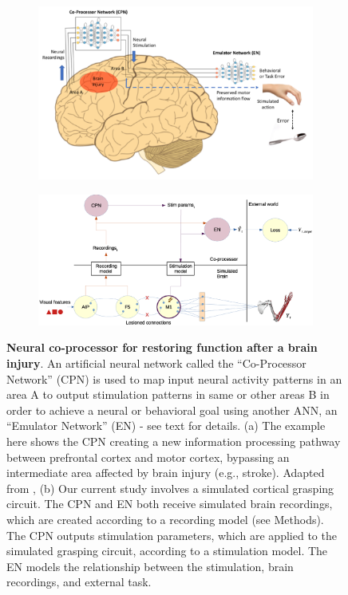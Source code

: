 \documentclass[12pt]{iopart}
\begin{document}
\begin{figure}
    \centering
    \begin{subfigure}[c]{0.88\textwidth}
		\centering
		\includegraphics[width=\textwidth]{weill_arch.png}
		\caption{}
	\end{subfigure}
	\hfill
    \begin{subfigure}[c]{0.88\textwidth}
		\centering
		\includegraphics[width=\textwidth]{cpn_michaels_arch_labeled.eps}
		\caption{}
	\end{subfigure}
	\hfill
    \caption{{\bf Neural co-processor for restoring function after a brain injury}.
    An artificial neural network called the “Co-Processor Network” (CPN) is used to
    map input neural activity patterns in an area A to output stimulation patterns
    in same or other areas B in order to achieve a neural or behavioral goal using
    another ANN, an “Emulator Network” (EN) - see text for details. (a) The example
    here shows the CPN creating a new information processing pathway between prefrontal
    cortex and motor cortex, bypassing an intermediate area affected by brain injury
    (e.g., stroke). Adapted from \cite{rao.coproc}, (b) Our current study involves a
    simulated cortical grasping circuit. The CPN and EN both receive simulated brain
    recordings, which are created according to a recording model (see Methods).
    The CPN outputs stimulation parameters, which are applied to the simulated
    grasping circuit, according to a stimulation model. The EN models the relationship between
    the     stimulation, brain recordings, and external task.}
    \label{fig:arch}
\end{figure}
\end{document}
